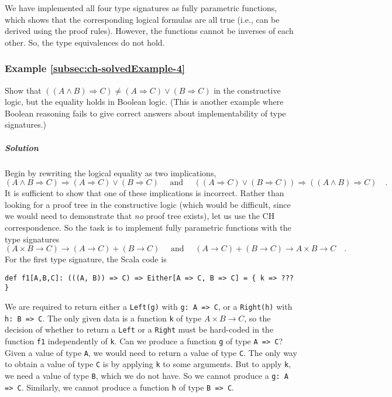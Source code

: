 We have implemented all four type signatures as fully parametric functions,
which shows that the corresponding logical formulas are all true (i.e.,
can be derived using the proof rules). However, the functions cannot
be inverses of each other. So, the type equivalences do not hold.

\subsubsection{Example \label{subsec:ch-solvedExample-4}\ref{subsec:ch-solvedExample-4}}

Show that $\left(\left(A\wedge B\right)\Rightarrow C\right)\neq(A\Rightarrow C)\vee(B\Rightarrow C)$
in the constructive logic, but the equality holds in Boolean logic.
(This is another example where Boolean reasoning fails to give correct
answers about implementability of type signatures.)

\subparagraph{Solution}

Begin by rewriting the logical equality as two implications,
\[
(A\wedge B\Rightarrow C)\Rightarrow(A\Rightarrow C)\vee(B\Rightarrow C)\quad\text{ and }\quad\left((A\Rightarrow C)\vee(B\Rightarrow C)\right)\Rightarrow\left(\left(A\wedge B\right)\Rightarrow C\right)\quad.
\]
It is sufficient to show that one of these implications is incorrect.
Rather than looking for a proof tree in the constructive logic (which
would be difficult, since we would need to demonstrate that \emph{no}
proof tree exists), let us use the CH correspondence. So the task
is to implement fully parametric functions with the type signatures
\[
(A\times B\rightarrow C)\rightarrow(A\rightarrow C)+(B\rightarrow C)\quad\text{ and }\quad(A\rightarrow C)+(B\rightarrow C)\rightarrow A\times B\rightarrow C\quad.
\]
For the first type signature, the Scala code is
\begin{lstlisting}
def f1[A,B,C]: (((A, B)) => C) => Either[A => C, B => C] = { k => ??? }
\end{lstlisting}
We are required to return either a \lstinline!Left(g)! with \lstinline!g: A => C!,
or a \lstinline!Right(h)! with \lstinline!h: B => C!. The only given
data is a function \lstinline!k! of type $A\times B\rightarrow C$,
so the decision of whether to return a \lstinline!Left! or a \lstinline!Right!
must be hard-coded in the function \lstinline!f1! independently of
\lstinline!k!. Can we produce a function \lstinline!g! of type \lstinline!A => C!?
Given a value of type \lstinline!A!, we would need to return a value
of type \lstinline!C!. The only way to obtain a value of type \lstinline!C!
is by applying \lstinline!k! to some arguments. But to apply \lstinline!k!,
we need a value of type \lstinline!B!, which we do not have. So we
cannot produce a \lstinline!g: A => C!. Similarly, we cannot produce
a function \lstinline!h! of type \lstinline!B => C!.

